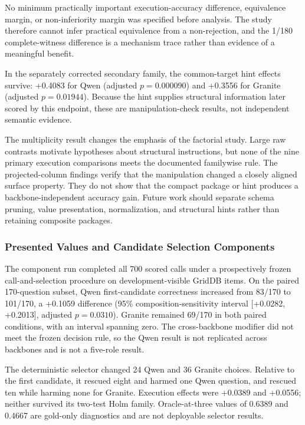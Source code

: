 \documentclass[applsci,article,submit,moreauthors]{Definitions/mdpi}
\begin{document}
No minimum practically important execution-accuracy difference, equivalence margin, or non-inferiority margin was specified before analysis. The study therefore cannot infer practical equivalence from a non-rejection, and the 1/180 complete-witness difference is a mechanism trace rather than evidence of a meaningful benefit.

In the separately corrected secondary family, the common-target hint effects survive: +0.4083 for Qwen (adjusted $p=0.000090$) and +0.3556 for Granite (adjusted $p=0.01944$). Because the hint supplies structural information later scored by this endpoint, these are manipulation-check results, not independent semantic evidence.

The multiplicity result changes the emphasis of the factorial study. Large raw contrasts motivate hypotheses about structural instructions, but none of the nine primary execution comparisons meets the documented familywise rule. The projected-column findings verify that the manipulation changed a closely aligned surface property. They do not show that the compact package or hint produces a backbone-independent accuracy gain. Future work should separate schema pruning, value presentation, normalization, and structural hints rather than retaining composite packages.

\subsubsection{Presented Values and Candidate Selection Components}

The component run completed all 700 scored calls under a prospectively frozen call-and-selection procedure on development-visible GridDB items. On the paired 170-question subset, Qwen first-candidate correctness increased from 83/170 to 101/170, a +0.1059 difference (95\% composition-sensitivity interval [+0.0282, +0.2013], adjusted $p=0.0310$). Granite remained 69/170 in both paired conditions, with an interval spanning zero. The cross-backbone modifier did not meet the frozen decision rule, so the Qwen result is not replicated across backbones and is not a five-role result.

The deterministic selector changed 24 Qwen and 36 Granite choices. Relative to the first candidate, it rescued eight and harmed one Qwen question, and rescued ten while harming none for Granite. Execution effects were +0.0389 and +0.0556; neither survived its two-test Holm family. Oracle-at-three values of 0.6389 and 0.4667 are gold-only diagnostics and are not deployable selector results.
\end{document}
